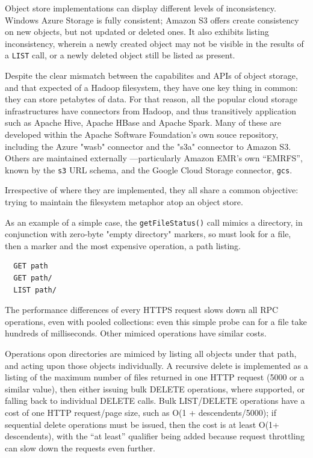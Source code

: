 \documentclass[conference]{IEEEtran}
\begin{document}
Object store implementations can display different levels of inconsistency.
Windows Azure Storage is fully consistent;
Amazon S3 offers create consistency on new objects, but not updated or deleted ones.
It also exhibits listing inconsistency, wherein a newly created object
may not be visible in the results of a \texttt{LIST} call, or a newly deleted
object still be listed as present.


Despite the clear mismatch between the capabilites and APIs of object storage,
and that expected of a Hadoop filesystem, they have one key thing in common:
they can store petabytes of data.
For that reason, all the popular cloud storage infrastructures have connectors
from Hadoop, and thus transitively application such as Apache Hive, Apache HBase
and Apache Spark.
Many of these are developed within the Apache Software Foundation's own
souce repository, including the Azure "wasb" connector and the "s3a" connector
to Amazon S3.
Others are maintained externally ---particularly Amazon EMR's own ``EMRFS'',
known by the \texttt{s3} URL schema, and the Google Cloud Storage connector,
\texttt{gcs}.

Irrespective of where they are implemented, they all share a common objective:
trying to maintain the filesystem metaphor atop an object store.

As an example of a simple case, the \texttt{getFileStatus()} call mimics
a directory, in conjunction with zero-byte "empty directory" markers,
so must look for a file, then a marker and the most expensive operation, a path listing.

\begin{verbatim}
  GET path
  GET path/
  LIST path/
\end{verbatim}

The performance differences of every HTTPS request slows
down all RPC operations, even with pooled collections: even this simple probe
can for a file take hundreds of milliseconds.
Other mimiced operations have similar costs.

Operations opon directories are mimiced by listing all objects under that path,
and acting upon those objects individually.
A recursive delete is implemented as a listing of the maximum number of files
returned in one HTTP request (5000 or a similar value), then either issuing
bulk DELETE operations, where supported, or falling back to individual DELETE
calls.
Bulk LIST/DELETE operations have a cost of one HTTP request/page size, such
as O(1 + descendents/5000); if sequential delete operations must be issued, then
the cost is at least O(1+ descendents), with the ``at least'' qualifier being
added because request throttling can slow down the requests even further.
\end{document}
